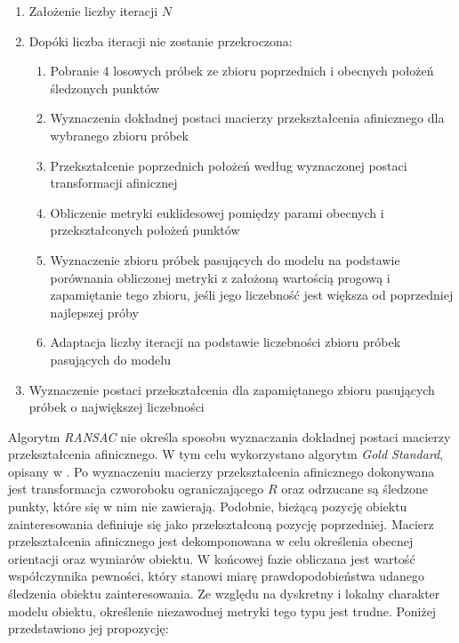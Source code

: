 \begin{enumerate}

	\item Założenie liczby iteracji $N$
	\item Dopóki liczba iteracji nie zostanie przekroczona:
	
	\begin{enumerate}
		
		\item Pobranie 4 losowych próbek ze zbioru poprzednich i obecnych położeń śledzonych punktów
		\item Wyznaczenia dokładnej postaci macierzy przekształcenia afinicznego dla wybranego zbioru próbek
		\item Przekształcenie poprzednich położeń według wyznaczonej postaci transformacji afinicznej
		\item Obliczenie metryki euklidesowej pomiędzy parami obecnych i przekształconych położeń punktów
		\item Wyznaczenie zbioru próbek pasujących do modelu na podstawie porównania obliczonej metryki z założoną wartością progową i zapamiętanie tego zbioru, jeśli jego liczebność jest większa od poprzedniej najlepszej próby
		\item Adaptacja liczby iteracji na podstawie liczebności zbioru próbek pasujących do modelu
			
	\end{enumerate}
	
	\item Wyznaczenie postaci przekształcenia dla zapamiętanego zbioru pasujących próbek o największej liczebności

\end{enumerate}

Algorytm \textit{RANSAC} nie określa sposobu wyznaczania dokładnej postaci macierzy przekształcenia afinicznego. W tym celu wykorzystano algorytm \textit{Gold Standard}, opisany w \cite{Hartley2004}. Po wyznaczeniu macierzy przekształcenia afinicznego dokonywana jest transformacja czworoboku ograniczającego $R$ oraz odrzucane są śledzone punkty, które się w nim nie zawierają. Podobnie, bieżącą pozycję obiektu zainteresowania definiuje się jako przekształconą pozycję poprzedniej. Macierz przekształcenia afinicznego jest dekomponowana w celu określenia obecnej orientacji oraz wymiarów obiektu. W końcowej fazie obliczana jest wartość współczynnika pewności, który stanowi miarę prawdopodobieństwa udanego śledzenia obiektu zainteresowania. Ze względu na dyskretny i lokalny charakter modelu obiektu, określenie niezawodnej metryki tego typu jest trudne. Poniżej przedstawiono jej propozycję:

